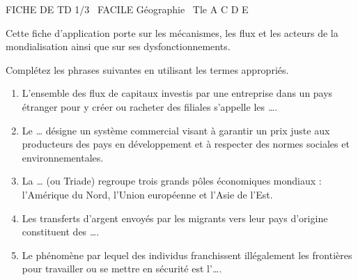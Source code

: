 \documentclass[11pt]{article}
\begin{document}
\begin{tcolorbox}[enhanced,colback=popink,colframe=popink,arc=10pt,boxrule=0pt,left=12pt,right=12pt,top=9pt,bottom=9pt]
{\color{white}\popxbold\small FICHE DE TD 1/3 \textbullet\ FACILE \hfill Géographie \textbullet\ Tle A C D E\par}
\end{tcolorbox}
\vspace{4pt}
\noindent Cette fiche d'application porte sur les mécanismes, les flux et les acteurs de la mondialisation ainsi que sur ses dysfonctionnements.

\begin{exercice}
Complétez les phrases suivantes en utilisant les termes appropriés.
\begin{enumerate}
    \item L'ensemble des flux de capitaux investis par une entreprise dans un pays étranger pour y créer ou racheter des filiales s'appelle les \textit{\dots}.
    \item Le \textit{\dots} désigne un système commercial visant à garantir un prix juste aux producteurs des pays en développement et à respecter des normes sociales et environnementales.
    \item La \textit{\dots} (ou Triade) regroupe trois grands pôles économiques mondiaux : l'Amérique du Nord, l'Union européenne et l'Asie de l'Est.
    \item Les transferts d'argent envoyés par les migrants vers leur pays d'origine constituent des \textit{\dots}.
    \item Le phénomène par lequel des individus franchissent illégalement les frontières pour travailler ou se mettre en sécurité est l'\textit{\dots}.
\end{enumerate}
\end{exercice}
\end{document}
